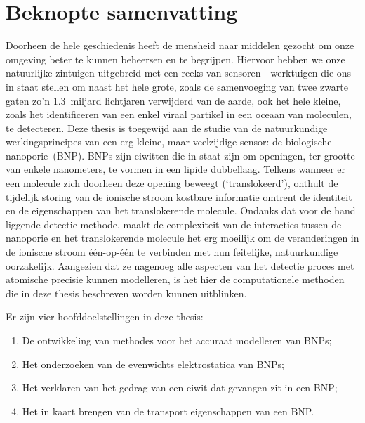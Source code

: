 \chapter{Beknopte samenvatting}
%
\label{ch:abstractnl}
%

Doorheen de hele geschiedenis heeft de mensheid naar middelen gezocht om onze omgeving beter te kunnen
beheersen en te begrijpen. Hiervoor hebben we onze natuurlijke zintuigen uitgebreid met een reeks van
sensoren---werktuigen die ons in staat stellen om naast het hele grote, zoals de samenvoeging van twee zwarte
gaten zo'n \num{1.3}~miljard lichtjaren verwijderd van de aarde, ook het hele kleine, zoals het identificeren
van een enkel viraal partikel in een oceaan van moleculen, te detecteren. Deze thesis is toegewijd aan de
studie van de natuurkundige werkingsprincipes van een erg kleine, maar veelzijdige sensor: de biologische
nanoporie~(BNP). BNPs zijn eiwitten die in staat zijn om openingen, ter grootte van enkele nanometers, te
vormen in een lipide dubbellaag. Telkens wanneer er een molecule zich doorheen deze opening beweegt
(`translokeerd'), onthult de tijdelijk storing van de ionische stroom kostbare informatie omtrent de
identiteit en de eigenschappen van het translokerende molecule. Ondanks dat voor de hand liggende detectie
methode, maakt de complexiteit van de interacties tussen de nanoporie en het translokerende molecule het erg
moeilijk om de veranderingen in de ionische stroom \'{e}\'{e}n-op-\'{e}\'{e}n te verbinden met hun feitelijke,
natuurkundige oorzakelijk. Aangezien dat ze nagenoeg alle aspecten van het detectie proces met atomische
precisie kunnen modelleren, is het hier de computationele methoden die in deze thesis beschreven worden kunnen
uitblinken.

Er zijn vier hoofddoelstellingen in deze thesis:
%
\begin{enumerate}
  \item De ontwikkeling van methodes voor het accuraat modelleren van BNPs;
  \item Het onderzoeken van de evenwichts elektrostatica van BNPs;  
  \item Het verklaren van het gedrag van een eiwit dat gevangen zit in een BNP;
  \item Het in kaart brengen van de transport eigenschappen van een BNP.
\end{enumerate}
%

